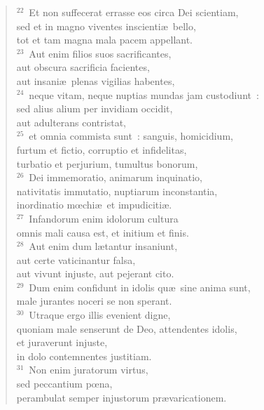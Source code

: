 \begin{verse}${}^{22}$~Et non suffecerat errasse eos circa Dei scientiam,\\ sed et in magno viventes inscienti\ae\ bello,\\ tot et tam magna mala pacem appellant.\\
${}^{23}$~Aut enim filios suos sacrificantes,\\ aut obscura sacrificia facientes,\\ aut insani\ae\ plenas vigilias habentes,\\
${}^{24}$~neque vitam, neque nuptias mundas jam custodiunt~:\\ sed alius alium per invidiam occidit,\\ aut adulterans contristat,\\
${}^{25}$~et omnia commista sunt~: sanguis, homicidium,\\ furtum et fictio, corruptio et infidelitas,\\ turbatio et perjurium, tumultus bonorum,\\
${}^{26}$~Dei immemoratio, animarum inquinatio,\\ nativitatis immutatio, nuptiarum inconstantia,\\ inordinatio mœchi\ae\ et impudiciti\ae .\\
${}^{27}$~Infandorum enim idolorum cultura\\ omnis mali causa est, et initium et finis.\\
${}^{28}$~Aut enim dum l\ae tantur insaniunt,\\ aut certe vaticinantur falsa,\\ aut vivunt injuste, aut pejerant cito.\\
${}^{29}$~Dum enim confidunt in idolis qu\ae\ sine anima sunt,\\ male jurantes noceri se non sperant.\\
${}^{30}$~Utraque ergo illis evenient digne,\\ quoniam male senserunt de Deo, attendentes idolis,\\ et juraverunt injuste,\\ in dolo contemnentes justitiam.\\
${}^{31}$~Non enim juratorum virtus,\\ sed peccantium pœna,\\ perambulat semper injustorum pr\ae varicationem.\end{verse}



